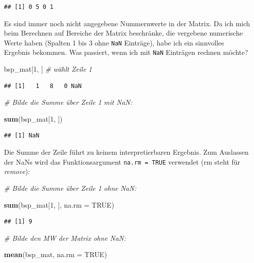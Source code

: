 \documentclass[
  ngerman,
]{book}
\newenvironment{Shaded}{\begin{snugshade}}{\end{snugshade}}
\newcommand{\AttributeTok}[1]{\textcolor[rgb]{0.13,0.29,0.53}{#1}}
\newcommand{\CommentTok}[1]{\textcolor[rgb]{0.56,0.35,0.01}{\textit{#1}}}
\newcommand{\ConstantTok}[1]{\textcolor[rgb]{0.56,0.35,0.01}{#1}}
\newcommand{\DecValTok}[1]{\textcolor[rgb]{0.00,0.00,0.81}{#1}}
\newcommand{\FunctionTok}[1]{\textcolor[rgb]{0.13,0.29,0.53}{\textbf{#1}}}
\newcommand{\NormalTok}[1]{#1}
\begin{document}
\begin{verbatim}
## [1] 0 5 0 1
\end{verbatim}

Es sind immer noch nicht angegebene Nummernwerte in der Matrix. Da ich mich beim Berechnen auf Bereiche der Matrix beschränke, die vergebene numerische Werte haben (Spalten 1 bis 3 ohne \texttt{NaN} Einträge), habe ich ein sinnvolles Ergebnis bekommen. Was passiert, wenn ich mit \texttt{NaN} Einträgen rechnen möchte?

\begin{Shaded}
\begin{Highlighting}[]
\NormalTok{bsp\_mat[}\DecValTok{1}\NormalTok{, ]      }\CommentTok{\# wählt Zeile 1}
\end{Highlighting}
\end{Shaded}

\begin{verbatim}
## [1]   1   8   0 NaN
\end{verbatim}

\begin{Shaded}
\begin{Highlighting}[]
\CommentTok{\# Bilde die Summe über Zeile 1 mit NaN:}

\FunctionTok{sum}\NormalTok{(bsp\_mat[}\DecValTok{1}\NormalTok{, ]) }
\end{Highlighting}
\end{Shaded}

\begin{verbatim}
## [1] NaN
\end{verbatim}

Die Summe der Zeile führt zu keinem interpretierbaren Ergebnis. Zum Auslassen der NaNs wird das Funktionsargument \texttt{na.rm\ =\ TRUE} verwendet (rm steht für \emph{remove}):

\begin{Shaded}
\begin{Highlighting}[]
\CommentTok{\# Bilde die Summe über Zeile 1 ohne NaN:}

\FunctionTok{sum}\NormalTok{(bsp\_mat[}\DecValTok{1}\NormalTok{, ], }\AttributeTok{na.rm =} \ConstantTok{TRUE}\NormalTok{)}
\end{Highlighting}
\end{Shaded}

\begin{verbatim}
## [1] 9
\end{verbatim}

\begin{Shaded}
\begin{Highlighting}[]
\CommentTok{\# Bilde den MW der Matrix ohne NaN:}

\FunctionTok{mean}\NormalTok{(bsp\_mat, }\AttributeTok{na.rm =} \ConstantTok{TRUE}\NormalTok{)}
\end{Highlighting}
\end{Shaded}
\end{document}
